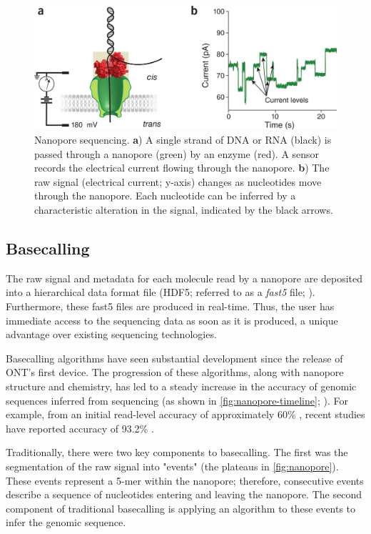 \begin{figure}
\centering
\includegraphics[width=0.9\columnwidth]{Chapter0/Figs/nanopore.png}
\caption{Nanopore sequencing. \textbf{a}) A single strand of DNA or RNA (black) is passed through a nanopore (green) by an enzyme (red). A sensor records the electrical current flowing through the nanopore. \textbf{b}) The raw signal (electrical current; y-axis) changes as nucleotides move through the nanopore. Each nucleotide can be inferred by a characteristic alteration in the signal, indicated by the black arrows.}
\label{fig:nanopore}
\end{figure}

\subsection{Basecalling}

The raw signal and metadata for each molecule read by a nanopore are deposited into a hierarchical data format file (HDF5; referred to as a \emph{fast5} file; \cite{hdf5}). Furthermore, these fast5 files are produced in real-time. Thus, the user has immediate access to the sequencing data as soon as it is produced, a unique advantage over existing sequencing technologies.

Basecalling algorithms have seen substantial development since the release of ONT's first device. The progression of these algorithms, along with nanopore structure and chemistry, has led to a steady increase in the accuracy of genomic sequences inferred from \ont{} sequencing (as shown in \autoref{fig:nanopore-timeline}; \cite{Rang2018}). For example, from an initial read-level accuracy of approximately 60\% \cite{Goodwin2015}, recent studies have reported accuracy of 93.2\% \cite{Silvestre2021}.

Traditionally, there were two key components to basecalling. The first was the segmentation of the raw signal into "events" (the plateaus in \autoref{fig:nanopore}). These events represent a 5-mer within the nanopore; therefore, consecutive events describe a sequence of nucleotides entering and leaving the nanopore. The second component of traditional basecalling is applying an algorithm to these events to infer the genomic sequence. 

